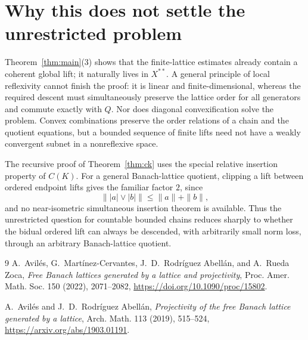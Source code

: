 \documentclass[11pt]{article}
\begin{document}
\section{Why this does not settle the unrestricted problem}

Theorem~\ref{thm:main}(3) shows that the finite-lattice estimates already
contain a coherent global lift; it naturally lives in \(X^{**}\).  A
general principle of local reflexivity cannot finish the proof: it is
linear and finite-dimensional, whereas the required descent must
simultaneously preserve the lattice order for all generators and commute
exactly with \(Q\).  Nor does diagonal convexification solve the problem.
Convex combinations preserve the order relations of a chain and the
quotient equations, but a bounded sequence of finite lifts need not have
a weakly convergent subnet in a nonreflexive space.

The recursive proof of Theorem~\ref{thm:ck} uses the special relative
insertion property of \(C(K)\).  For a general Banach-lattice quotient,
clipping a lift between ordered endpoint lifts gives the familiar factor
\(2\), since
\[
 \bigl\||a|\vee|b|\bigr\|\le\|a\|+\|b\|,
\]
and no near-isometric simultaneous insertion theorem is available.  Thus
the unrestricted question for countable bounded chains reduces sharply
to whether the bidual ordered lift can always be descended, with
arbitrarily small norm loss, through an arbitrary Banach-lattice quotient.

\begin{thebibliography}{9}
A.~Avil\'es, G.~Mart\'inez-Cervantes, J.~D.~Rodr\'iguez Abell\'an, and
A.~Rueda Zoca,
\emph{Free Banach lattices generated by a lattice and projectivity},
Proc. Amer. Math. Soc. 150 (2022), 2071--2082,
\url{https://doi.org/10.1090/proc/15802}.

A.~Avil\'es and J.~D.~Rodr\'iguez Abell\'an,
\emph{Projectivity of the free Banach lattice generated by a lattice},
Arch. Math. 113 (2019), 515--524,
\url{https://arxiv.org/abs/1903.01191}.
\end{thebibliography}
\end{document}
